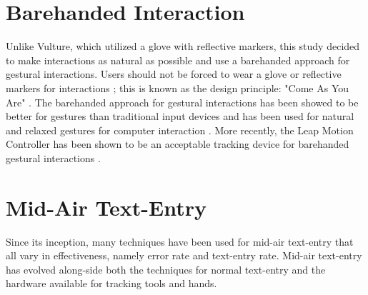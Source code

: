 \section{Barehanded Interaction}
Unlike Vulture, which utilized a glove with reflective markers, this study decided to make interactions as natural as possible and use a barehanded approach for gestural interactions. Users should not be forced to wear a glove or reflective markers for interactions \cite{ref_natural_interactions}; this is known as the design principle: "Come As You Are" \cite{ref_come_as_you_are}. The barehanded approach for gestural interactions has been showed to be better for gestures than traditional input devices \cite{ref_barehanded_interaction} and has been used for natural and relaxed gestures for computer interaction \cite{ref_natural_relaxed_gestures}. More recently, the Leap Motion Controller has been shown to be an acceptable tracking device for barehanded gestural interactions \cite{ref_alvin_thesis,ref_darren_thesis,ref_leap_device_evaluation_1,ref_leap_device_evaluation_2,ref_leap_pointing_device}.

\section{Mid-Air Text-Entry}
Since its inception, many techniques have been used for mid-air text-entry that all vary in effectiveness, namely error rate and text-entry rate. Mid-air text-entry has evolved along-side both the techniques for normal text-entry and the hardware available for tracking tools and hands.


